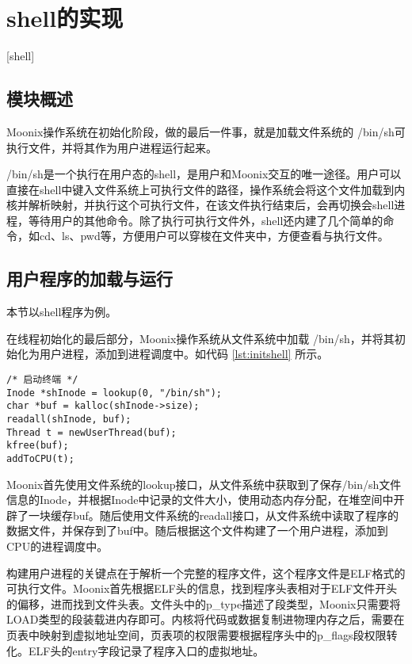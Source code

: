 
\chapter{shell的实现}[shell]
\label{chapter:shell}

\section{模块概述}

Moonix操作系统在初始化阶段，做的最后一件事，就是加载文件系统的 /bin/sh可执行文件，并将其作为用户进程运行起来。

/bin/sh是一个执行在用户态的shell，是用户和Moonix交互的唯一途径。用户可以直接在shell中键入文件系统上可执行文件的路径，操作系统会将这个文件加载到内核并解析映射，并执行这个可执行文件，在该文件执行结束后，会再切换会shell进程，等待用户的其他命令。除了执行可执行文件外，shell还内建了几个简单的命令，如cd、ls、pwd等，方便用户可以穿梭在文件夹中，方便查看与执行文件。

\section{用户程序的加载与运行}

本节以shell程序为例。

在线程初始化的最后部分，Moonix操作系统从文件系统中加载 /bin/sh，并将其初始化为用户进程，添加到进程调度中。如代码 \ref{lst:initshell} 所示。

\begin{minipage}[c]{0.95\textwidth}
\begin{lstlisting}[language={moonix}, caption={Moonix加载shell}, label={lst:initshell}]
/* 启动终端 */
Inode *shInode = lookup(0, "/bin/sh");
char *buf = kalloc(shInode->size);
readall(shInode, buf);
Thread t = newUserThread(buf);
kfree(buf);
addToCPU(t);
\end{lstlisting}
\end{minipage}

Moonix首先使用文件系统的lookup接口，从文件系统中获取到了保存/bin/sh文件信息的Inode，并根据Inode中记录的文件大小，使用动态内存分配，在堆空间中开辟了一块缓存buf。随后使用文件系统的readall接口，从文件系统中读取了程序的数据文件，并保存到了buf中。随后根据这个文件构建了一个用户进程，添加到CPU的进程调度中。

构建用户进程的关键点在于解析一个完整的程序文件，这个程序文件是ELF格式的可执行文件。Moonix首先根据ELF头的信息，找到程序头表相对于ELF文件开头的偏移，进而找到文件头表。文件头中的p\_type描述了段类型，Moonix只需要将LOAD类型的段装载进内存即可。内核将代码或数据复制进物理内存之后，需要在页表中映射到虚拟地址空间，页表项的权限需要根据程序头中的p\_flags段权限转化。ELF头的entry字段记录了程序入口的虚拟地址。

